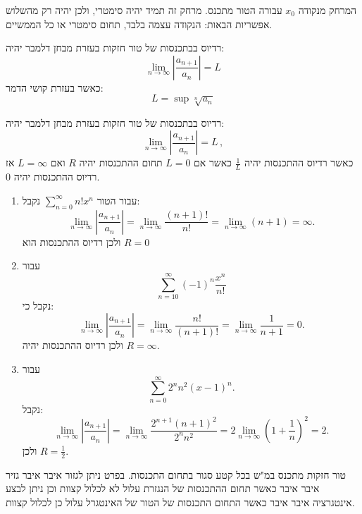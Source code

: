 \documentclass{tstextbook}
\begin{document}
\begin{definition}
המרחק מנקודה \(x_0\) עבורה הטור מתכנס. מרחק זה תמיד יהיה סימטרי, ולכן יהיה רק מהשלוש אפשריות הבאות: הנקודה עצמה בלבד, תחום סימטרי או כל הממשיים.

\end{definition}
\begin{reminder}
רדיוס בבתכנסות של טור חזקות בעזרת מבחן דלמבר יהיה:
$$\operatorname*{lim}_{n\to\infty}\left|{\frac{a_{n+1}}{a_{n}}}\right|=L$$
כאשר בעזרת קושי הדמר:
$$L=\sup \sqrt[n]{a_n}$$

\end{reminder}
\begin{proposition}
רדיוס בבתכנסות של טור חזקות בעזרת מבחן דלמבר יהיה:
$$\operatorname*{lim}_{n\to\infty}\left|{\frac{a_{n+1}}{a_{n}}}\right|=L\,,$$
כאשר רדיוס ההתכנסות יהיה \(\frac{1}{L}\) כאשר אם \(L=0\) תחום ההתכנסות יהיה \(R\) ואם \(L=\infty\) אז רדיוס ההתכנסות יהיה 0.

\end{proposition}
\begin{example}
  \begin{enumerate}
    \item עבור הטור \(\sum_{n=0}^{\infty}n!x^{n}\) נקבל: 
$$\operatorname*{lim}_{n\to\infty}\left|{\frac{a_{n+1}}{a_{n}}}\right|=\operatorname*{lim}_{n\to\infty}{\frac{(n+1)!}{n!}}=\operatorname*{lim}_{n\to\infty}(n+1)=\infty.$$
ולכן רדיוס ההתכנסות הוא \(R=0\)


    \item עבור $$\sum_{n=10}^{\infty}\left(-1\right)^{n}{\frac{x^{n}}{n!}}$$ 
נקבל כי:
$$\operatorname*{lim}_{n\to\infty}\left|{\frac{a_{n+1}}{a_{n}}}\right|=\operatorname*{lim}_{n\to\infty}{\frac{n!}{(n+1)!}}=\operatorname*{lim}_{n\to\infty}{\frac{1}{n+1}}=0.$$
ולכן רדיוס ההתכנסות יהיה \(R=\infty\).


    \item עבור $$\sum_{n=0}^{\infty}2^{n}n^{2}(x-1)^{n}.$$ 
נקבל:
$$\operatorname*{lim}_{n\to\infty}\left|{\frac{a_{n+1}}{a_{n}}}\right|=\operatorname*{lim}_{n\to\infty}{\frac{2^{n+1}(n+1)^{2}}{2^{n}n^{2}}}=2\operatorname*{lim}_{n\to\infty}\left(1+{\frac{1}{n}}\right)^{2}=2.$$
ולכן \(R=\frac{1}{2}\).


  \end{enumerate}
\end{example}
\begin{proposition}
טור חזקות מתכנס במ"ש בכל קטע סגור בתחום התכנסות. בפרט ניתן לגזור איבר איבר גזיר איבר איבר כאשר תחום ההתכנסות של הנגזרת עלול לא לכלול קצוות וכן ניתן לבצע אינטגרציה איבר איבר כאשר התחום התכנסות של הטור של האינטגרל עלול כן לכלול קצוות.

\end{proposition}
\end{document}
